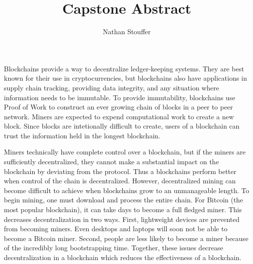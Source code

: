 \documentclass[11pt]{article}
\title{Capstone Abstract}
\author{Nathan Stouffer}
\date{}
\begin{document}
    \maketitle

    Blockchains provide a way to decentralize ledger-keeping systems.
    They are best known for their use in cryptocurrencies, but blockchains also have applications in supply chain tracking, providing data integrity, and any situation where information needs to be immutable.
    To provide immutability, blockchains use Proof of Work to construct an ever growing chain of blocks in a peer to peer network.
    Miners are expected to expend computational work to create a new block.
    Since blocks are intetionally difficult to create, users of a blockchain can trust the information held in the longest blockchain.

    Miners technically have complete control over a blockchain, but if the miners are sufficiently decentralized, they cannot make a substantial impact on the blockchain by deviating from the protocol.
    Thus a blockchains perform better when control of the chain is decentralized.
    However, decentralized mining can become difficult to achieve when blockchains grow to an unmanageable length.
    To begin mining, one must download and process the entire chain.
    For Bitcoin (the most popular blockchain), it can take days to become a full fledged miner.
    This decreases decentralization in two ways.
    First, lightweight devices are prevented from becoming miners.
    Even desktops and laptops will soon not be able to become a Bitcoin miner.
    Second, people are less likely to become a miner because of the incredibly long bootstrapping time.
    Together, these issues decrease decentralization in a blockchain which reduces the effectiveness of a blockchain.



\end{document}
